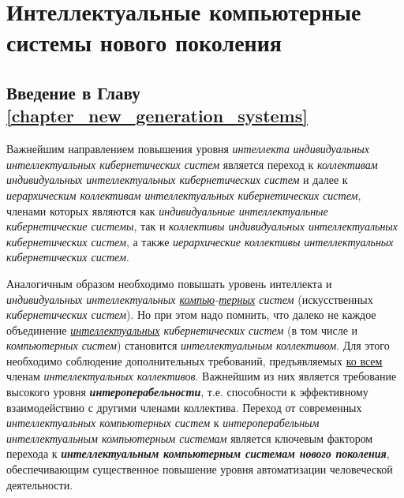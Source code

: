 \chapter{Интеллектуальные компьютерные системы нового поколения}
\label{chapter_new_generation_systems} 


\section*{Введение в Главу \ref{chapter_new_generation_systems}}

Важнейшим направлением повышения уровня \textit{интеллекта} \textit{индивидуальных интеллектуальных кибернетических систем} является переход к \textit{коллективам индивидуальных интеллектуальных кибернетических систем} и далее к \textit{иерархическим коллективам интеллектуальных кибернетических систем}, членами которых являются как \textit{индивидуальные интеллектуальные кибернетические системы}, так и \textit{коллективы индивидуальных интеллектуальных кибернетических систем}, а также \textit{иерархические коллективы интеллектуальных кибернетических систем}. 

Аналогичным образом необходимо повышать уровень интеллекта и \textit{индивидуальных интеллектуальных \underline{компью}-\underline{терных} систем} (искусственных \textit{кибернетических систем}). Но при этом надо помнить, что далеко не каждое объединение \textit{\underline{интеллектуальных} кибернетических систем} (в том числе и \textit{компьютерных систем}) становится \textit{интеллектуальным коллективом}. Для этого необходимо соблюдение дополнительных требований, предъявляемых \underline{ко всем} членам \textit{интеллектуальных коллективов}. Важнейшим из них является требование высокого уровня \textbf{\textit{интероперабельности}}, т.е. способности к эффективному взаимодействию с другими членами коллектива. Переход от современных \textit{интеллектуальных компьютерных систем} к \textit{интероперабельным интеллектуальным компьютерным системам} является ключевым фактором перехода к \textbf{\textit{интеллектуальным компьютерным системам нового поколения}}, обеспечивающим существенное повышение уровня автоматизации человеческой деятельности.

